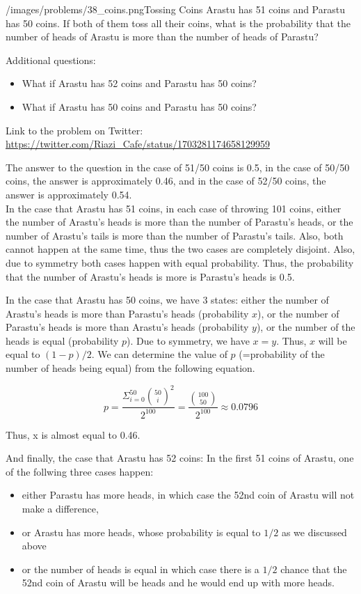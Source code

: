 \begin{problem}{/images/problems/38_coins.png}{Tossing Coins}
    Arastu has 51 coins and Parastu has 50 coins. If both of them toss all their coins, what is the probability that the number of heads of Arastu  is more than the number of heads of Parastu?

Additional questions:
\begin{itemize}
\item What if Arastu has 52 coins and  Parastu has 50 coins?
\item What if Arastu has 50 coins and  Parastu has 50 coins?
\end{itemize}

Link to the problem on Twitter:  \url{https://twitter.com/Riazi_Cafe/status/1703281174658129959}
\end{problem}
\begin{solution}
The answer to the question in the case of 51/50 coins is 0.5, in the case of 50/50 coins, the answer is approximately 0.46, and in the case of 52/50 coins, the answer is approximately 0.54.\\[0.2cm]

In the case that Arastu has 51 coins, in each case of throwing 101 coins, either the number of Arastu's heads is more than the number of Parastu's heads, or the number of Arastu's tails is more than the number of Parastu's tails. Also, both cannot happen at the same time, thus the two cases are completely disjoint. Also, due to symmetry both cases happen with equal probability. Thus, the probability that the number of Arastu's heads is more is Parastu's heads is 0.5.

In the case that Arastu has 50 coins, we have 3 states: either the number of Arastu's heads is more than Parastu's heads (probability $x$), or the number of Parastu's heads is more than Arastu's heads (probability $y$), or the number of the heads is equal (probability $p$). Due to symmetry, we have $x=y$. Thus, $x$ will be equal to $(1-p)/2$.
We can determine  the value of $p$ (=probability of the number of heads being equal) from the following equation. 

$$
p = \frac{\Sigma_{i=0}^{50}{50 \choose i}^2}{2^{100}} = \frac{{100 \choose 50}}{2^{100}} \approx 0.0796
$$

Thus, x is almost equal to 0.46.


And finally, the case that Arastu has 52 coins: In the first 51 coins of Arastu, one of the follwing three cases happen:
\begin{itemize}
\item either Parastu has more heads, in which case the 52nd coin of Arastu will not make a difference,
\item or Arastu has more heads, whose probability is equal to $1/2$ as we discussed above
\item or the number of heads is equal in which case there is a $1/2$ chance that the 52nd coin of Arastu will be heads and he would end up with more heads. 
\end{itemize}


\end{solution}
